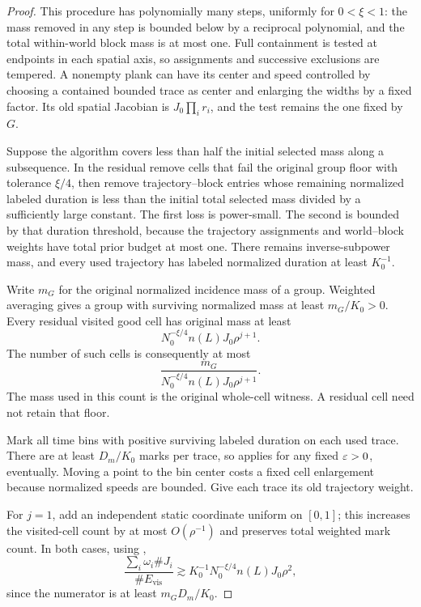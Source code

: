 \begin{proof}
This procedure has polynomially many steps, uniformly
for \(0<\xi<1\): the mass removed in any step is bounded
below by a reciprocal polynomial, and the total
within-world block mass is at most one.
Full containment is tested at endpoints in each spatial
axis, so assignments and successive exclusions are
tempered.  A nonempty plank can have its center and
speed controlled by choosing a contained bounded trace
as center and enlarging the widths by a fixed factor.
Its old spatial Jacobian is \(J_0\prod_i r_i\), and the
test remains the one fixed by \(G\).

Suppose the algorithm covers less than half the initial
selected mass along a subsequence.
In the residual remove cells that fail the original
group floor with tolerance \(\xi/4\), then remove
trajectory--block entries whose remaining normalized
labeled duration is less than the initial total selected
mass divided by a sufficiently large constant.
The first loss is power-small.  The second is bounded
by that duration threshold, because the trajectory
assignments and world--block weights have total prior
budget at most one.
There remains inverse-subpower mass, and every used
trajectory has labeled normalized duration at least
\(K_0^{-1}\).

Write \(m_G\) for the original normalized incidence mass
of a group.  Weighted averaging gives a group with
surviving normalized mass at least \(m_G/K_0>0\).
Every residual visited good cell has original mass at
least
\[
 N_0^{-\xi/4}n(L)J_0\rho^{j+1}.
\]
The number of such cells is consequently at most
\begin{equation}
 \frac{m_G}
 {N_0^{-\xi/4}n(L)J_0\rho^{j+1}}.
 \label{a01:old-cell-count}
\end{equation}
The mass used in this count is the original whole-cell
witness.  A residual cell need not retain that floor.

Mark all time bins with positive surviving labeled
duration on each used trace.  There are at least
\(D_m/K_0\) marks per trace, so
 applies for any fixed
\(\varepsilon>0\), eventually.
Moving a point to the bin center costs a fixed cell
enlargement because normalized speeds are bounded.
Give each trace its old trajectory weight.

For \(j=1\), add an independent static coordinate
uniform on \([0,1]\); this increases the visited-cell
count by at most \(O(\rho^{-1})\) and preserves total
weighted mark count.  In both cases, using
,
\begin{equation}
 \frac{\sum_i\omega_i\#J_i}{\#E_{\mathrm{vis}}}
 \gtrsim
 K_0^{-1}N_0^{-\xi/4}n(L)J_0\rho^2,
 \label{a01:greedy-raw-multiplicity}
\end{equation}
since the numerator is at least \(m_GD_m/K_0\).


\end{proof}

